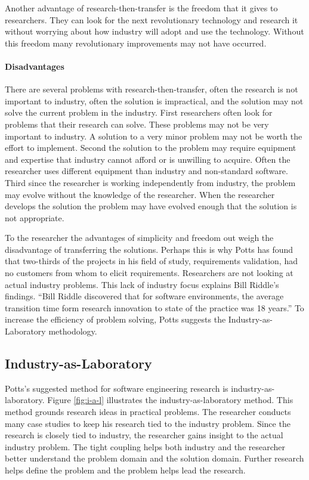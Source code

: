 Another advantage of research-then-transfer is the freedom that it gives to
researchers.  They can look for the next revolutionary technology and
research it without worrying about how industry will adopt and use the
technology.  Without this freedom many revolutionary improvements may not
have occurred.

\paragraph{Disadvantages}

There are several problems with research-then-transfer, often the research
is not important to industry, often the solution is impractical, and the
solution may not solve the current problem in the industry.  First
researchers often look for problems that their research can solve.  These
problems may not be very important to industry.  A solution to a very minor
problem may not be worth the effort to implement.  Second the solution to
the problem may require equipment and expertise that industry cannot afford
or is unwilling to acquire.  Often the researcher uses different equipment
than industry and non-standard software.  Third since the researcher is
working independently from industry, the problem may evolve without the
knowledge of the researcher.  When the researcher develops the solution the
problem may have evolved enough that the solution is not appropriate.

To the researcher the advantages of simplicity and freedom out weigh the
disadvantage of transferring the solutions.  Perhaps this is why Potts has
found that two-thirds of the projects in his field of study, requirements
validation, had no customers from whom to elicit
requirements\cite{Potts93}. Researchers are not looking at actual industry
problems.  This lack of industry focus explains Bill Riddle's findings.
``Bill Riddle discovered that for software environments, the average
transition time form research innovation to state of the practice was 18
years.\cite{Riddle84}''\cite{Potts93} To increase the efficiency of problem
solving, Potts suggests the Industry-as-Laboratory methodology.

\subsection{Industry-as-Laboratory} 

Potts's suggested method for software engineering research is
industry-as-laboratory.  Figure \ref{fig:i-a-l} illustrates the
industry-as-laboratory method.  This method grounds research ideas in
practical problems.  The researcher conducts many case studies to keep his
research tied to the industry problem.  Since the research is closely tied
to industry, the researcher gains insight to the actual industry problem.
The tight coupling helps both industry and the researcher better understand
the problem domain and the solution domain.  Further research helps define
the problem and the problem helps lead the research.

